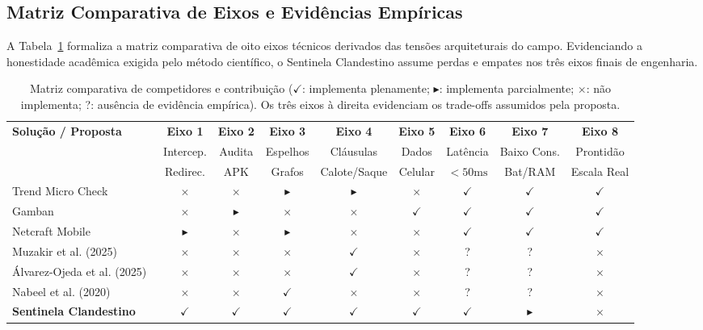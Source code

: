 \subsection{Matriz Comparativa de Eixos e Evid\^{e}ncias Emp\'{i}ricas}

A Tabela~\ref{tab:matriz_concorrentes} formaliza a matriz comparativa de oito eixos t\'{e}cnicos derivados das tens\~{o}es arquiteturais do campo. Evidenciando a honestidade acad\^{e}mica exigida pelo m\'{e}todo cient\'{i}fico, o Sentinela Clandestino assume perdas e empates nos tr\^{e}s eixos finais de engenharia.

\begin{table}[t]
\centering
\caption{Matriz comparativa de competidores e contribui\c{c}\~{a}o ($\checkmark$: implementa plenamente; $\blacktriangleright$: implementa parcialmente; $\times$: n\~{a}o implementa; ?: aus\^{e}ncia de evid\^{e}ncia emp\'{i}rica). Os tr\^{e}s eixos \`{a} direita evidenciam os trade-offs assumidos pela proposta.}
\label{tab:matriz_concorrentes}
\setlength{\tabcolsep}{4.5pt}
\scriptsize
\begin{tabular}{lcccccccc}
\toprule
\textbf{Solu\c{c}\~{a}o / Proposta} & \textbf{Eixo 1} & \textbf{Eixo 2} & \textbf{Eixo 3} & \textbf{Eixo 4} & \textbf{Eixo 5} & \textbf{Eixo 6} & \textbf{Eixo 7} & \textbf{Eixo 8} \\
& Intercep. & Audita & Espelhos & Cl\'{a}usulas & Dados & Lat\^{e}ncia & Baixo Cons. & Prontid\~{a}o \\
& Redirec. & APK & Grafos & Calote/Saque & Celular & $< 50\text{ms}$ & Bat/RAM & Escala Real \\
\midrule
Trend Micro Check & $\times$ & $\times$ & $\blacktriangleright$ & $\blacktriangleright$ & $\times$ & $\checkmark$ & $\checkmark$ & $\checkmark$ \\
Gamban & $\times$ & $\blacktriangleright$ & $\times$ & $\times$ & $\checkmark$ & $\checkmark$ & $\checkmark$ & $\checkmark$ \\
Netcraft Mobile & $\blacktriangleright$ & $\times$ & $\blacktriangleright$ & $\times$ & $\times$ & $\checkmark$ & $\checkmark$ & $\checkmark$ \\
Muzakir et al. (2025)~\cite{muzakir2025text} & $\times$ & $\times$ & $\times$ & $\checkmark$ & $\times$ & ? & ? & $\times$ \\
\'{A}lvarez-Ojeda et al. (2025)~\cite{alvarezojeda2025precom} & $\times$ & $\times$ & $\times$ & $\checkmark$ & $\times$ & ? & ? & $\times$ \\
Nabeel et al. (2020)~\cite{nabeel2020following} & $\times$ & $\times$ & $\checkmark$ & $\times$ & $\times$ & ? & ? & $\times$ \\
\midrule
\textbf{Sentinela Clandestino} & $\mathbf{\checkmark}$ & $\mathbf{\checkmark}$ & $\mathbf{\checkmark}$ & $\mathbf{\checkmark}$ & $\mathbf{\checkmark}$ & $\mathbf{\checkmark}$ & $\mathbf{\blacktriangleright}$ & $\mathbf{\times}$ \\
\bottomrule
\end{tabular}
\end{table}

